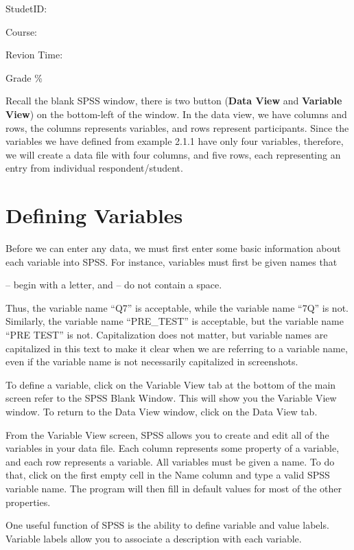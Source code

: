 \documentclass[
]{book}
\begin{document}
StudetID:

Course:

Revion Time:

Grade \%

Recall the blank SPSS window, there is two button (\textbf{Data View} and \textbf{Variable View}) on the bottom-left of the window. In the data view, we have columns and rows, the columns represents variables, and rows represent participants. Since the variables we have defined from example 2.1.1 have only four variables, therefore, we will create a data file with four columns, and five rows, each representing an entry from individual respondent/student.

\hypertarget{defining-variables}{%
\section{Defining Variables}\label{defining-variables}}

Before we can enter any data, we must first enter some basic information about each variable into SPSS. For instance, variables must first be given names that

-- begin with a letter, and
-- do not contain a space.

Thus, the variable name ``Q7'' is acceptable, while the variable name ``7Q'' is not. Similarly, the variable name ``PRE\_TEST'' is acceptable, but the variable name ``PRE TEST'' is not. Capitalization does not matter, but variable names are capitalized in this text to make it clear when we are referring to a variable name, even if the variable name is not necessarily capitalized in screenshots.

To define a variable, click on the Variable View tab at the bottom of the main screen refer to the SPSS Blank Window. This will show you the Variable View window. To return to the Data View window, click on the Data View tab.

From the Variable View screen, SPSS allows you to create and edit all of the variables in your data file. Each column represents some property of a variable, and each row represents a variable. All variables must be given a name. To do that, click on the first empty cell in the Name column and type a valid SPSS variable name. The program will then fill in default values for most of the other properties.

One useful function of SPSS is the ability to define variable and value labels. Variable labels allow you to associate a description with each variable.
\end{document}

